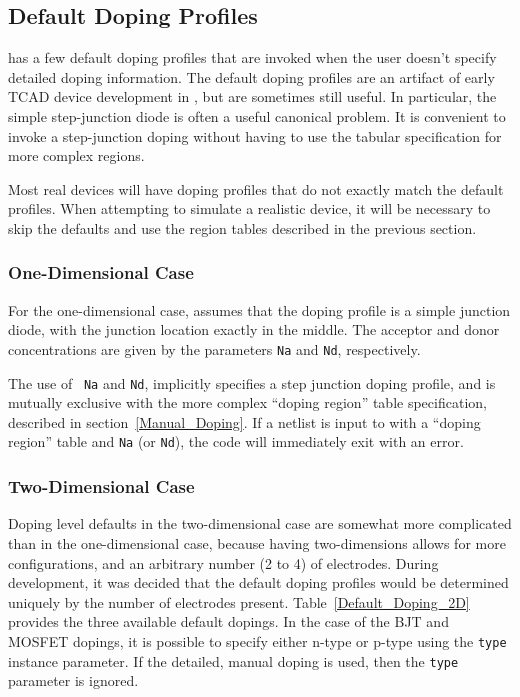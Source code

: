 %

\newpage
\subsection{Default Doping Profiles}
\Xyce{} has a few default doping profiles that are invoked when the user
doesn't specify detailed doping information.  The default doping 
profiles are an artifact of early TCAD device development in \Xyce{}, but are 
sometimes still useful.  In particular, the simple step-junction diode
is often a useful canonical problem.  It is convenient to invoke a
step-junction doping without having to use the tabular specification
for more complex regions.

Most real devices will have doping profiles that do not exactly match the
default profiles.  When attempting to simulate a realistic device, it
will be necessary to skip the defaults and use the region tables described in
the previous section.

\subsubsection{One-Dimensional Case} \label{one_d_default_dope}
For the one-dimensional case, \Xyce{} assumes that the doping profile is a
simple junction diode, with the junction location exactly in the middle.  The
acceptor and donor concentrations are given by the parameters \texttt{Na} and
\texttt{Nd}, respectively.  

The use of ~\texttt{Na} and \texttt{Nd}, implicitly specifies a step junction
doping profile, and is mutually exclusive with the more complex ``doping
region'' table specification, described in section~\ref{Manual_Doping}.  If a
netlist is input to \Xyce{} with a ``doping region'' table and \texttt{Na} (or
\texttt{Nd}), the code will immediately exit with an error.

\subsubsection{Two-Dimensional Case} \label{two_d_default_dope}
Doping level defaults in the two-dimensional case are somewhat more complicated
than in the one-dimensional case, because having two-dimensions allows for more
configurations, and an arbitrary number (2 to 4) of electrodes.  During \Xyce{}
development, it was decided that the default doping profiles would be
determined uniquely by the number of electrodes present.
Table~\ref{Default_Doping_2D} provides the three available default dopings.  In
the case of the BJT and MOSFET dopings, it is possible to specify either n-type
or p-type using the \texttt{type} instance parameter.   If the detailed, manual
doping is used, then the \texttt{type} parameter is ignored.

